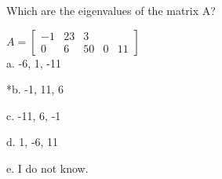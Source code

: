 
Which are the eigenvalues of the matrix A?

$
A = \begin{bmatrix}
-1 & 23 & 3 \\
0 & 6 & 5
0 & 0 & 11
\end{bmatrix}
$
\\
a. -6, 1, -11

*b. -1, 11, 6

c. -11, 6, -1

d. 1, -6, 11

e. I do not know.\\
